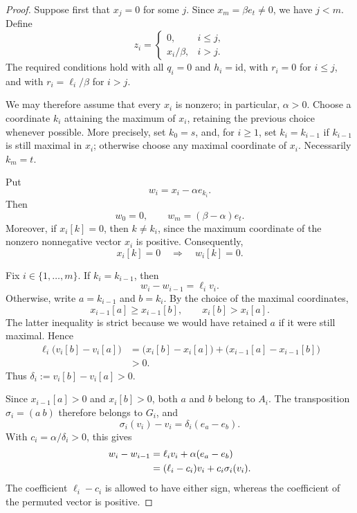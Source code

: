 \documentclass[11pt]{article}
\begin{document}
\begin{proof}
Suppose first that $x_j=0$ for some $j$. Since $x_m=\beta e_t\neq 0$,
we have $j<m$. Define
\[
  z_i=\begin{cases}
    0,&i\leq j,\\
    x_i/\beta,&i>j.
  \end{cases}
\]
The required conditions hold with all $q_i=0$ and $h_i=\mathrm{id}$, with $r_i=0$
for $i\leq j$, and with $r_i=\ell_i/\beta$ for $i>j$.

We may therefore assume that every $x_i$ is nonzero; in particular,
$\alpha>0$. Choose a coordinate $k_i$ attaining the maximum of
$x_i$, retaining the previous choice whenever possible. More precisely,
set $k_0=s$, and, for $i\geq 1$, set $k_i=k_{i-1}$ if $k_{i-1}$ is
still maximal in $x_i$; otherwise choose any maximal coordinate of
$x_i$. Necessarily $k_m=t$.

Put
\[
  w_i=x_i-\alpha e_{k_i}.
\]
Then
\[
  w_0=0,\qquad w_m=(\beta-\alpha)e_t.
\]
Moreover, if $x_i[k]=0$, then $k\neq k_i$, since the maximum
coordinate of the nonzero nonnegative vector $x_i$ is positive.
Consequently,
\begin{equation}\label{eq:zero-coordinate}
  x_i[k]=0\quad\Longrightarrow\quad w_i[k]=0.
\end{equation}

Fix $i\in\{1,\ldots,m\}$. If $k_i=k_{i-1}$, then
\begin{equation}\label{eq:no-switch}
  w_i-w_{i-1}=\ell_i v_i.
\end{equation}
Otherwise, write $a=k_{i-1}$ and $b=k_i$. By the choice of the
maximal coordinates,
\[
  x_{i-1}[a]\geq x_{i-1}[b],\qquad x_i[b]>x_i[a].
\]
The latter inequality is strict because we would have retained $a$
if it were still maximal. Hence
\begin{align*}
  \ell_i\bigl(v_i[b]-v_i[a]\bigr)
    &=\bigl(x_i[b]-x_i[a]\bigr)
      +\bigl(x_{i-1}[a]-x_{i-1}[b]\bigr)\\
    &>0.
\end{align*}
Thus $\delta_i:=v_i[b]-v_i[a]>0$.

Since $x_{i-1}[a]>0$ and $x_i[b]>0$, both $a$ and $b$ belong to
$A_i$. The transposition $\sigma_i=(a\ b)$ therefore belongs to
$G_i$, and
\[
  \sigma_i(v_i)-v_i=\delta_i(e_a-e_b).
\]
With $c_i=\alpha/\delta_i>0$, this gives
\begin{align}
  w_i-w_{i-1}
    &=\ell_i v_i+\alpha(e_a-e_b)\notag\\
    &=(\ell_i-c_i)v_i+c_i\sigma_i(v_i).
      \label{eq:switch}
\end{align}
The coefficient $\ell_i-c_i$ is allowed to have either sign, whereas
the coefficient of the permuted vector is positive.


\end{proof}
\end{document}
